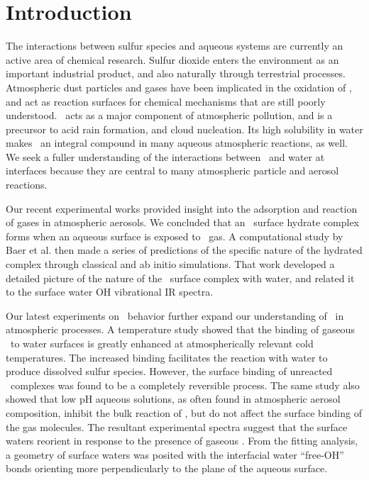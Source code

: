 \section{Introduction}

The interactions between sulfur species and aqueous systems are currently an active area of chemical research. Sulfur dioxide enters the environment as an important industrial product, and also naturally through terrestrial processes. Atmospheric dust particles and gases have been implicated in the oxidation of \suldiox, and act as reaction surfaces for chemical mechanisms that are still poorly understood.\cite{Baltrusaitis2011,Rubasinghege2010,Li2007} \suldiox~acts as a major component of atmospheric pollution, and is a precursor to acid rain formation, and cloud nucleation. Its high solubility in water makes \suldiox~an integral compound in many aqueous atmospheric reactions, as well. We seek a fuller understanding of the interactions between \suldiox~and water at interfaces because they are central to many atmospheric particle and aerosol reactions.

Our recent experimental works provided insight into the adsorption and reaction of gases in atmospheric aerosols.\cite{Tarbuck2005,Tarbuck2006} We concluded that an \suldiox~surface hydrate complex forms when an aqueous surface is exposed to \suldiox~gas. A computational study by Baer et al.\cite{Baer2010} then made a series of predictions of the specific nature of the hydrated complex through classical and ab initio simulations. That work developed a detailed picture of the nature of the \suldiox~surface complex with water, and related it to the surface water OH vibrational IR spectra.

Our latest experiments on \suldiox~behavior further expand our understanding of \suldiox~in atmospheric processes.\cite{Ota2011} A temperature study showed that the binding of gaseous \suldiox~to water surfaces is greatly enhanced at atmospherically relevant cold temperatures. The increased binding facilitates the reaction with water to produce dissolved sulfur species. However, the surface binding of unreacted \suldiox~complexes was found to be a completely reversible process. The same study also showed that low pH aqueous solutions, as often found in atmospheric aerosol composition, inhibit the bulk reaction of \suldiox, but do not affect the surface binding of the gas molecules. The resultant experimental spectra suggest that the surface waters reorient in response to the presence of gaseous \suldiox. From the fitting analysis, a geometry of surface waters was posited with the interfacial water ``free-OH'' bonds orienting more perpendicularly to the plane of the aqueous surface. 


